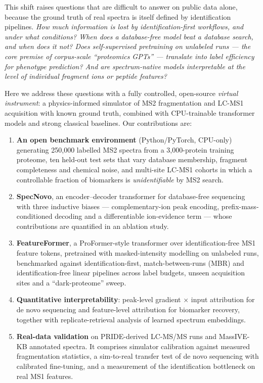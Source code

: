 \documentclass{sn-preview}
\begin{document}
This shift raises questions that are difficult to answer on public data alone, because the ground truth of real spectra is itself defined by identification pipelines. \emph{How much information is lost by identification-first workflows, and under what conditions? When does a database-free model beat a database search, and when does it not? Does self-supervised pretraining on unlabeled runs --- the core premise of corpus-scale ``proteomics GPTs'' --- translate into label efficiency for phenotype prediction? And are spectrum-native models interpretable at the level of individual fragment ions or peptide features?}

Here we address these questions with a fully controlled, open-source \emph{virtual instrument}: a physics-informed simulator of MS2 fragmentation and LC-MS1 acquisition with known ground truth, combined with CPU-trainable transformer models and strong classical baselines. Our contributions are:

\begin{enumerate}
\def\labelenumi{\arabic{enumi}.}
\item
  \textbf{An open benchmark environment} (Python/PyTorch, CPU-only) generating 250,000 labelled MS2 spectra from a 3,000-protein training proteome, ten held-out test sets that vary database membership, fragment completeness and chemical noise, and multi-site LC-MS1 cohorts in which a controllable fraction of biomarkers is \emph{unidentifiable} by MS2 search.
\item
  \textbf{SpecNovo}, an encoder--decoder transformer for database-free sequencing with three inductive biases --- complementary-ion peak encoding, prefix-mass-conditioned decoding and a differentiable ion-evidence term --- whose contributions are quantified in an ablation study.
\item
  \textbf{FeatureFormer}, a ProFormer-style transformer over identification-free MS1 feature tokens, pretrained with masked-intensity modelling on unlabeled runs, benchmarked against identification-first, match-between-runs (MBR) and identification-free linear pipelines across label budgets, unseen acquisition sites and a ``dark-proteome'' sweep.
\item
  \textbf{Quantitative interpretability}: peak-level gradient × input attribution for de novo sequencing and feature-level attribution for biomarker recovery, together with replicate-retrieval analysis of learned spectrum embeddings.
\item
  \textbf{Real-data validation} on PRIDE-derived LC-MS/MS runs and MassIVE-KB annotated spectra. It comprises simulator calibration against measured fragmentation statistics, a sim-to-real transfer test of de novo sequencing with calibrated fine-tuning, and a measurement of the identification bottleneck on real MS1 features.
\end{enumerate}
\end{document}
